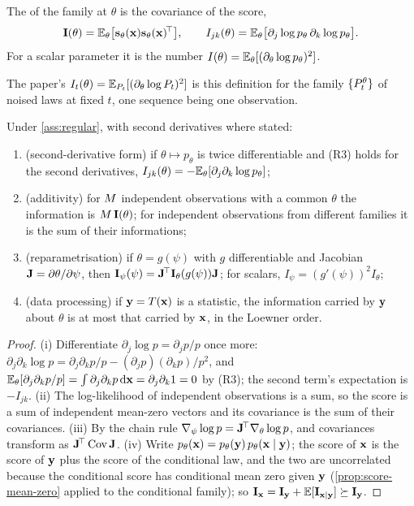 \begin{definition}
The  of the family at $\theta$ is the covariance of
the score,
\begin{equation}
  \mathbf{I}(\theta)=\mathbb{E}_\theta\bigl[\mathbf{s}_\theta(\mathbf{x})\mathbf{s}_\theta(\mathbf{x})^{\!\top}\bigr],
  \qquad I_{jk}(\theta)=\mathbb{E}_\theta\bigl[\partial_j\log p_\theta\,\partial_k\log p_\theta\bigr].
  \label{eq:fisher}
\end{equation}
For a scalar parameter it is the number $I(\theta)=\mathbb{E}_\theta[(\partial_\theta\log p_\theta)^2]$.
\end{definition}

The paper's $I_t(\theta)=\mathbb{E}_{P_t}[(\partial_\theta\log P_t)^2]$ is this definition for
the family $\{P_t^\theta\}$ of noised laws at fixed $t$, one sequence being one
observation.

\begin{proposition}
\label{prop:fisher-props}
Under \cref{ass:regular}, with second derivatives where stated:
\begin{enumerate}[label=(\roman*)]
\item (second-derivative form) if $\theta\mapsto p_\theta$ is twice differentiable and
  (R3) holds for the second derivatives, $I_{jk}(\theta)=-\mathbb{E}_\theta[\partial_j\partial_k\log p_\theta]$;
\item (additivity) for $M$ independent observations with a common $\theta$ the
  information is $M\,\mathbf{I}(\theta)$; for independent observations from different
  families it is the sum of their informations;
\item (reparametrisation) if $\theta=g(\psi)$ with $g$ differentiable and Jacobian
  $\mathbf{J}=\partial\theta/\partial\psi$, then $\mathbf{I}_\psi(\psi)=\mathbf{J}^{\!\top}\mathbf{I}_\theta(g(\psi))\mathbf{J}$;
  for scalars, $I_\psi=(g'(\psi))^2I_\theta$;
\item (data processing) if $\mathbf{y}=T(\mathbf{x})$ is a statistic, the information carried by
  $\mathbf{y}$ about $\theta$ is at most that carried by $\mathbf{x}$, in the Loewner order.
\end{enumerate}
\end{proposition}
\begin{proof}
(i) Differentiate $\partial_j\log p=\partial_jp/p$ once more:
$\partial_j\partial_k\log p=\partial_j\partial_kp/p-(\partial_jp)(\partial_kp)/p^2$, and
$\mathbb{E}_\theta[\partial_j\partial_kp/p]=\int\partial_j\partial_kp\,\mathrm{d}\mathbf{x}=\partial_j\partial_k1=0$ by (R3);
the second term's expectation is $-I_{jk}$. (ii) The log-likelihood of independent
observations is a sum, so the score is a sum of independent mean-zero vectors and
its covariance is the sum of their covariances. (iii) By the chain rule
$\nabla_\psi\log p=\mathbf{J}^{\!\top}\nabla_\theta\log p$, and covariances transform as
$\mathbf{J}^{\!\top}\operatorname{Cov}\mathbf{J}$. (iv) Write $p_\theta(\mathbf{x})=p_\theta(\mathbf{y})\,p_\theta(\mathbf{x}\mid\mathbf{y})$;
the score of $\mathbf{x}$ is the score of $\mathbf{y}$ plus the score of the conditional law,
and the two are uncorrelated because the conditional score has conditional mean zero
given $\mathbf{y}$ (\cref{prop:score-mean-zero} applied to the conditional family); so
$\mathbf{I}_{\mathbf{x}}=\mathbf{I}_{\mathbf{y}}+\mathbb{E}[\mathbf{I}_{\mathbf{x}\mid\mathbf{y}}]\succeq\mathbf{I}_{\mathbf{y}}$.
\end{proof}


